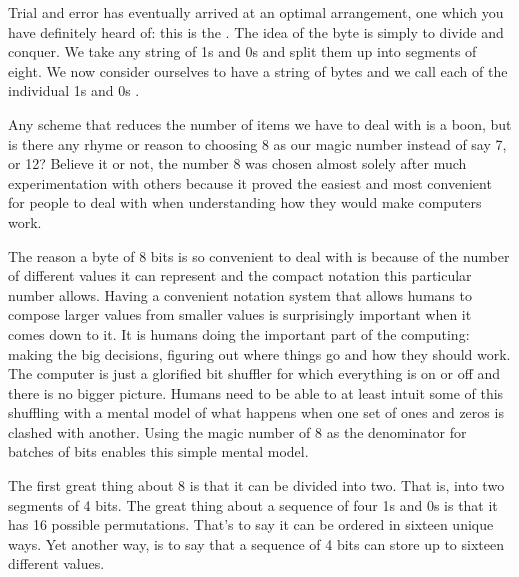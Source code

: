 Trial and error has eventually arrived at an optimal arrangement, one which
you have definitely heard of: this is the . The idea of the byte
is simply to divide and conquer. We take any string of 1s and 0s and split
them up into segments of eight. We now consider ourselves to have a string
of bytes and we call each of the individual 1s and 0s . 

Any scheme that reduces the number of items we have to deal with is a boon,
but is there any rhyme or reason to choosing 8 as our magic number instead
of say 7, or 12? Believe it or not, the number 8 was chosen almost solely
after much experimentation with others because it proved the easiest and
most convenient for people to deal with when understanding how they would
make computers work.

The reason a byte of 8 bits is so convenient to deal with is because of
the number of different values it can represent and the compact notation
this particular number allows. Having a convenient notation system that
allows humans to compose larger values from smaller values is surprisingly
important when it comes down to it. It is humans doing the important part
of the computing: making the big decisions, figuring out where things go
and how they should work. The computer is just a glorified bit shuffler
for which everything is on or off and there is no bigger picture. Humans
need to be able to at least intuit some of this shuffling with a mental
model of what happens when one set of ones and zeros is clashed with another.
Using the magic number of 8 as the denominator for batches of bits enables
this simple mental model.

The first great thing about 8 is that it can be divided into two. That is,
into two segments of 4 bits. The great thing about a sequence of four 1s
and 0s is that it has 16 possible permutations. That's to say it can be
ordered in sixteen unique ways. Yet another way, is to say that a sequence
of 4 bits can store up to sixteen different values.


